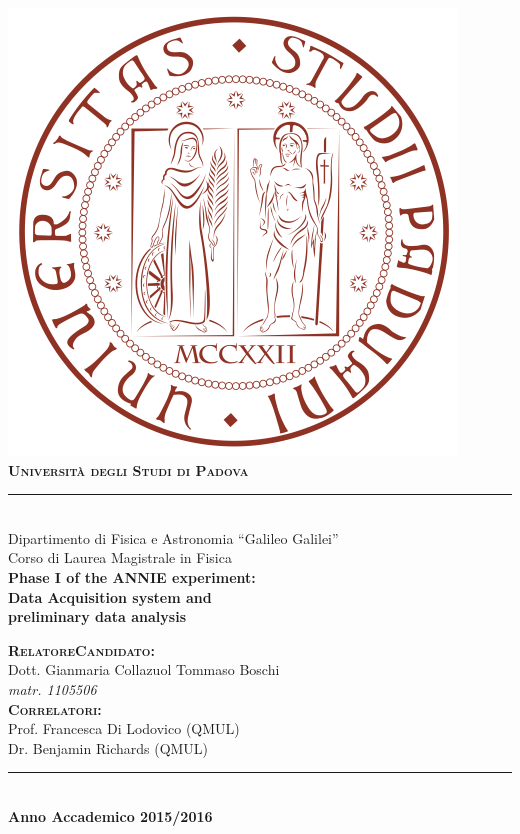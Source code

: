 \documentclass[a4 paper,12pt,oneside]{article}
\begin{document}
\pagestyle{empty}
\begin{center}
  \includegraphics[scale=0.70]{pics/logoUNIPD}
  \\[10pt]

  {\huge \textbf{\textsc{Università degli Studi di Padova}}}

  \rule[5pt]{420pt}{.4pt}
  \\[5pt]

  {\Large Dipartimento di Fisica e Astronomia ``Galileo Galilei''}
  \\[5pt]
  {\Large Corso di Laurea Magistrale in Fisica}\\
  \vspace{40mm}
  {\Huge \textbf{Phase I of the ANNIE experiment:\\ Data Acquisition system and \\ %
  preliminary data analysis}}
\end{center}
\vspace{25mm}
\textbf{\textsc{\small Relatore\hfill Candidato:\hspace*{6.8mm}}}
\\Dott. Gianmaria Collazuol \hfill Tommaso Boschi\\
\hspace*{\fill} \emph{\small matr. \emph{1105506}}\hspace*{3mm} \\
\textbf{\textsc{\small Correlatori:}}\hfill \\ Prof. Francesca Di Lodovico (QMUL) \\
Dr. Benjamin Richards (QMUL) \hfill\\
\vspace*{\fill}
\begin{center}
  \rule[1pt]{420pt}{.4pt} \\
  \textbf{Anno Accademico 2015/2016}
\end{center}
\end{document}
